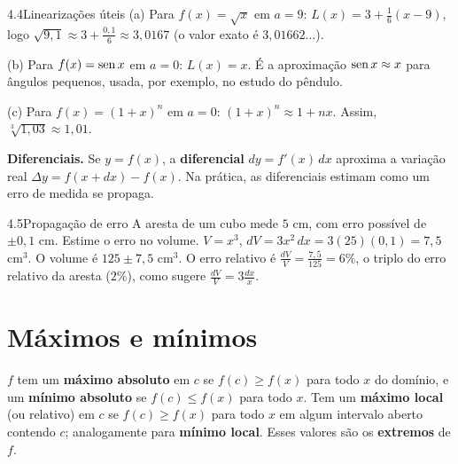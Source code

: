\begin{exemplo}{4.4}{Linearizações úteis}
(a) Para $f(x)=\sqrt x$ em $a=9$: $L(x)=3+\frac16(x-9)$, logo
$\sqrt{9{,}1}\approx3+\frac{0{,}1}6\approx3{,}0167$ (o valor exato é $3{,}01662\ldots$).

(b) Para $f(x)=\operatorname{sen} x$ em $a=0$: $L(x)=x$. É a aproximação $\operatorname{sen} x\approx x$ para ângulos
pequenos, usada, por exemplo, no estudo do pêndulo.

(c) Para $f(x)=(1+x)^n$ em $a=0$: $(1+x)^n\approx1+nx$. Assim, $\sqrt[3]{1{,}03}\approx1{,}01$.
\end{exemplo}

\textbf{Diferenciais.} Se $y=f(x)$, a \textbf{diferencial} $dy=f'(x)\,dx$ aproxima a variação
real $\Delta y=f(x+dx)-f(x)$. Na prática, as diferenciais estimam como um erro de medida se
propaga.

\begin{exemplo}{4.5}{Propagação de erro}
A aresta de um cubo mede $5$ cm, com erro possível de $\pm0{,}1$ cm. Estime o erro no volume.
\solucao
$V=x^3$, $dV=3x^2\,dx=3(25)(0{,}1)=7{,}5$ cm$^3$. O volume é $125\pm7{,}5$ cm$^3$. O erro
relativo é $\frac{dV}V=\frac{7{,}5}{125}=6\%$, o triplo do erro relativo da aresta ($2\%$),
como sugere $\frac{dV}{V}=3\frac{dx}{x}$.
\end{exemplo}

\section{Máximos e mínimos}

\begin{definicao}
$f$ tem um \textbf{máximo absoluto} em $c$ se $f(c)\ge f(x)$ para todo $x$ do domínio, e um
\textbf{mínimo absoluto} se $f(c)\le f(x)$ para todo $x$. Tem um \textbf{máximo local}
(ou relativo) em $c$ se $f(c)\ge f(x)$ para todo $x$ em algum intervalo aberto contendo $c$;
analogamente para \textbf{mínimo local}. Esses valores são os \textbf{extremos} de $f$.
\end{definicao}



